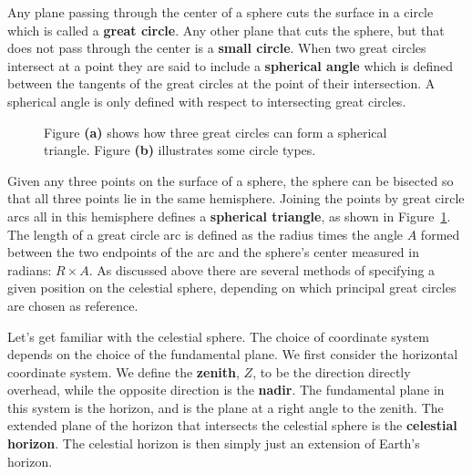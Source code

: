 Any plane passing through the center of a sphere cuts the surface in a
circle which is called a {\bf great circle}. Any other plane that cuts
the sphere, but that does not pass through the center is a {\bf small
  circle}. When two great circles intersect at a point they are said
to include a {\bf spherical angle} which is defined between the
tangents of the great circles at the point of their intersection. A
spherical angle is only defined with respect to intersecting great
circles.
%
\begin{figure}[htpb]
	\centering
	\begin{subfigure}[t]{0.50\linewidth}
	\centering
	
	\caption{}
		\label{fig:cel-sph-tri}
	\end{subfigure}%
	\begin{subfigure}[t]{0.50\linewidth}
	\centering
	
	\caption{}
		\label{fig:cel-sph-circ}
	\end{subfigure}
	\caption{Figure \textbf{(a)} shows how three great circles can form a spherical triangle.
	Figure \textbf{(b)} illustrates some circle types.}
\end{figure}
%
Given any three points on the surface of a sphere, the sphere can be
bisected so that all three points lie in the same hemisphere. Joining
the points by great circle arcs all in this hemisphere defines a {\bf
spherical triangle}, as shown in Figure~\ref{fig:cel-sph-tri}.
The length of a great circle arc is defined as
the radius times the angle $A$ formed between the two endpoints of the
arc and the sphere's center measured in radians: $R\times A$.
As discussed above there are several methods of specifying a given position on the
celestial sphere, depending on which principal great circles are
chosen as reference.

Let's get familiar with the celestial sphere. The choice of coordinate system depends on
the choice of the fundamental plane. We first consider the horizontal coordinate system.
We define the \textbf{zenith}, $Z$, to be the direction
directly overhead, while the opposite direction is the \textbf{nadir}. The fundamental plane
in this system is the horizon, and is the plane at a right angle to the zenith.
The extended plane of the horizon that intersects the celestial sphere is the
\textbf{celestial horizon}.
The celestial horizon is then simply just an extension of
Earth's horizon.

